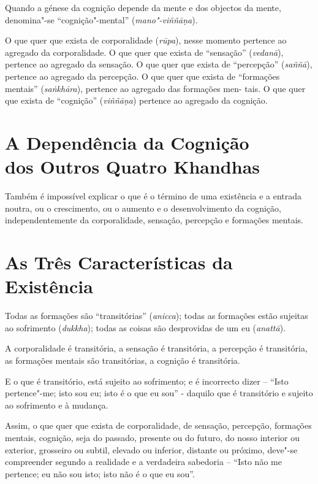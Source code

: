 Quando a génese da cognição depende da mente e dos objectos da mente,
denomina"-se “cognição"-mental” (\emph{mano"-viññāṇa}).


O que quer que exista de corporalidade (\emph{rūpa}), nesse momento pertence ao
agregado da corporalidade. O que quer que exista de “sensação”
(\emph{vedanā}), pertence ao agregado da sensação. O que quer que exista de
“percepção” (\emph{saññā}), pertence ao agregado da percepção. O que quer que
exista de “formações mentais” (\emph{saṅkhāra}), pertence ao agregado das
formações men- tais. O que quer que exista de “cognição” (\emph{viññāṇa})
pertence ao agregado da cognição.


\section{A Dependência da Cognição\\ dos Outros Quatro Khandhas}

Também é impossível explicar o que é o término de uma existência e a entrada
noutra, ou o crescimento, ou o aumento e o desenvolvimento da cognição,
independentemente da corporalidade, sensação, percepção e formações mentais.


\clearpage

\section{As Três Características da Existência}


Todas as formações são “transitórias” (\emph{anicca}); todas as formações
estão sujeitas ao sofrimento (\emph{dukkha}); todas as coisas são desprovidas de
um eu (\emph{anattā}).


A corporalidade é transitória, a sensação é transitória, a percepção é
transitória, as formações mentais são transitórias, a cognição é transitória.

E o que é transitório, está sujeito ao sofrimento; e é incorrecto dizer --
“Isto pertence"-me; isto sou eu; isto é o que eu sou” - daquilo que é
transitório e sujeito ao sofrimento e à mudança.

Assim, o que quer que exista de corporalidade, de sensação, percepção, formações
mentais, cognição, seja do passado, presente ou do futuro, do nosso interior ou
exterior, grosseiro ou subtil, elevado ou inferior, distante ou próximo, deve"-se
compreender segundo a realidade e a verdadeira sabedoria -- “Isto não me
pertence; eu não sou isto; isto não é o que eu sou”.

